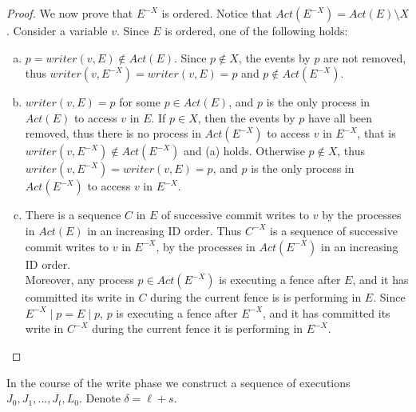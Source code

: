 \begin{proof}
	We now prove that $E^{-X}$ is ordered. Notice that $Act(E^{-X}) = Act(E) \setminus X$. Consider a variable $v$. Since $E$ is ordered, one of the following holds:
	\begin{enumerate}[(a)]
		\item $p = writer(v,E) \notin Act(E)$. Since $p \notin X$, the events by $p$ are not removed, thus $writer(v,E^{-X}) = writer(v,E) = p$ and $p \notin Act(E^{-X})$.
		\item $writer(v,E) = p$ for some $p \in Act(E)$, and $p$ is the only process in $Act(E)$ to access $v$ in $E$. If $p \in X$, then the events by $p$ have all been removed, thus there is no process in $Act(E^{-X})$ to access $v$ in $E^{-X}$, that is $writer(v,E^{-X}) \notin Act(E^{-X})$ and (a) holds. Otherwise $p \notin X$, thus $writer(v,E^{-X}) = writer(v,E) = p$, and $p$ is the only process in $Act(E^{-X})$ to access $v$ in $E^{-X}$.
		\item There is a sequence $C$ in $E$ of successive commit writes to $v$ by the processes in $Act(E)$ in an increasing ID order. Thus $C^{-X}$ is a sequence of successive commit writes to $v$ in $E^{-X}$, by the processes in $Act(E^{-X})$ in an increasing ID order.
		\\ Moreover, any process $p \in Act(E^{-X})$ is executing a fence after $E$, and it has committed its write in $C$ during the current fence is is performing in $E$. Since $E^{-X} \mid p = E \mid p$, $p$ is executing a fence after $E^{-X}$, and it has committed its write in $C^{-X}$ during the current fence it is performing in $E^{-X}$.
	\end{enumerate}
\end{proof}


In the course of the write phase we construct a sequence of executions $J_0,J_1,\ldots,J_t, L_0$. Denote $\delta = \ell+s$.

